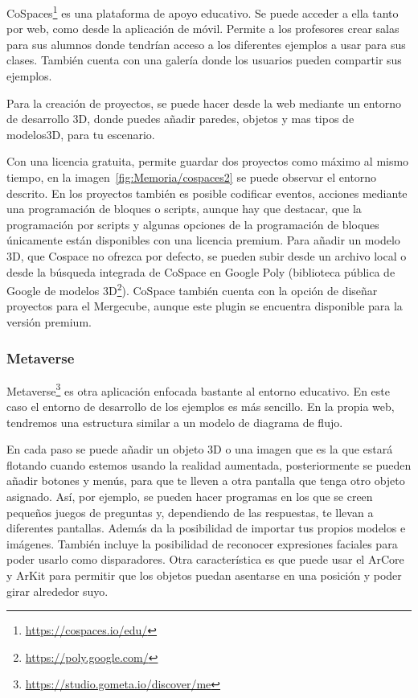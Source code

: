 CoSpaces\footnote{\url{https://cospaces.io/edu/}} es una plataforma de apoyo educativo. Se puede acceder a ella tanto por web, como desde la aplicación de móvil. Permite a los profesores crear salas para sus alumnos donde tendrían acceso a los diferentes ejemplos a usar para sus clases. También cuenta con una galería donde los usuarios pueden compartir sus ejemplos.


Para la creación de proyectos, se puede hacer desde la web mediante un entorno de desarrollo 3D, donde puedes añadir paredes, objetos y mas tipos de modelos3D, para tu escenario. 

Con una licencia gratuita, permite guardar dos proyectos como máximo al mismo tiempo, en la imagen~\ref{fig:Memoria/cospaces2} se puede observar el entorno descrito. En los proyectos también es posible codificar eventos, acciones mediante una programación de bloques o scripts, aunque hay que destacar, que la programación por scripts y algunas opciones de la programación de bloques únicamente están disponibles con una licencia premium. Para añadir un modelo 3D, que Cospace no ofrezca por defecto, se pueden subir desde un archivo local o desde la búsqueda integrada de CoSpace en Google Poly (biblioteca pública de Google de modelos 3D\footnote{\url{https://poly.google.com/}}).
CoSpace también cuenta con la opción de diseñar proyectos para el Mergecube, aunque este plugin se encuentra disponible para la versión premium.



\subsubsection{Metaverse} 

Metaverse\footnote{\url{https://studio.gometa.io/discover/me}} es otra aplicación enfocada bastante al entorno educativo. En este caso el entorno de desarrollo de los ejemplos es más sencillo. En la propia web, tendremos una estructura similar a un modelo de diagrama de flujo. 

En cada paso se puede añadir un objeto 3D o una imagen que es la que estará flotando cuando estemos usando la realidad aumentada, posteriormente se pueden añadir botones y menús, para que te lleven a otra pantalla que tenga otro objeto asignado. Así, por ejemplo, se pueden hacer programas en los que se creen pequeños juegos de preguntas y, dependiendo de las respuestas, te llevan a diferentes pantallas.
Además da la posibilidad de importar tus propios modelos e imágenes.
También incluye la posibilidad de reconocer expresiones faciales para poder usarlo como disparadores.
Otra característica es que puede usar el ArCore y ArKit para permitir que los objetos puedan asentarse en una posición y poder girar alrededor suyo.

